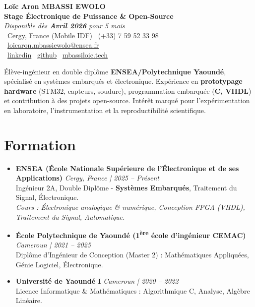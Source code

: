 \documentclass[a4paper,11pt]{article}
\begin{document}
\begin{center}
    {\Large \textbf{Loïc Aron MBASSI EWOLO}} \\ \vspace{4pt}
    \textbf{\large Stage Électronique de Puissance \& Open-Source} \\
    \textit{\small Disponible dès \textbf{Avril 2026} pour 5 mois} \\ \vspace{4pt}
    \small
    \faMapMarker\ Cergy, France (Mobile IDF) \quad
    \faPhone\ (+33) 7 59 52 33 98 \quad
    \faEnvelope\ \href{mailto:loicaron.mbassiewolo@ensea.fr}{loicaron.mbassiewolo@ensea.fr} \\ \vspace{2pt}
    \faLinkedin\ \href{https://www.linkedin.com/in/loic-aron-mbassi-ewolo-3942a9246/}{linkedin} \quad
    \faGithub\ \href{https://github.com/Nameless0l}{github} \quad
    \faGlobe\ \href{https://mbassiloic.tech}{mbassiloic.tech}
\end{center}

\vspace{-6pt}

\noindent\small{Élève-ingénieur en double diplôme \textbf{ENSEA/Polytechnique Yaoundé}, spécialisé en systèmes embarqués et électronique. Expérience en \textbf{prototypage hardware} (STM32, capteurs, soudure), programmation embarquée (\textbf{C, VHDL}) et contribution à des projets open-source. Intérêt marqué pour l'expérimentation en laboratoire, l'instrumentation et la reproductibilité scientifique.}

\section{Formation}
\begin{itemize}[leftmargin=*, label=\tiny$\bullet$, nosep]
    \item \textbf{ENSEA (École Nationale Supérieure de l'Électronique et de ses Applications)} \hfill \textit{Cergy, France | 2025 -- Présent} \\
    \small{Ingénieur 2A, Double Diplôme - \textbf{Systèmes Embarqués}, Traitement du Signal, Électronique.} \\
    \textit{\small{Cours : Électronique analogique \& numérique, Conception FPGA (VHDL), Traitement du Signal, Automatique.}}
    \vspace{2pt}
    \item \textbf{École Polytechnique de Yaoundé (1\textsuperscript{ère} école d'ingénieur CEMAC)} \hfill \textit{Cameroun | 2021 -- 2025} \\
    \small{Diplôme d'Ingénieur de Conception (Master 2) : Mathématiques Appliquées, Génie Logiciel, Électronique.}
    \item \textbf{Université de Yaoundé I} \hfill \textit{Cameroun | 2020 -- 2022} \\
    \small{Licence Informatique \& Mathématiques : Algorithmique C, Analyse, Algèbre Linéaire.}
\end{itemize}
\end{document}
